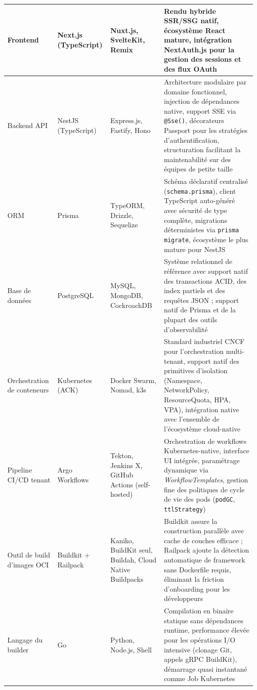\begin{longtable}{|p{2.8cm}|p{2.5cm}|p{2.5cm}|p{5.2cm}|}
Frontend
  & Next.js (TypeScript)
  & Nuxt.js, SvelteKit, Remix
  & Rendu hybride SSR/SSG natif, écosystème React mature, intégration NextAuth.js pour la gestion des sessions et des flux OAuth \\
\hline
Backend API
  & NestJS (TypeScript)
  & Express.js, Fastify, Hono
  & Architecture modulaire par domaine fonctionnel, injection de dépendances native, support SSE via \texttt{@Sse()}, décorateurs Passport pour les stratégies d'authentification, structuration facilitant la maintenabilité sur des équipes de petite taille \cite{nestjs-auth} \\
\hline
ORM
  & Prisma
  & TypeORM, Drizzle, Sequelize
  & Schéma déclaratif centralisé (\texttt{schema.prisma}), client TypeScript auto-généré avec sécurité de type complète, migrations déterministes via \texttt{prisma migrate}, écosystème le plus mature pour NestJS \cite{prisma-docs} \\
\hline
Base de données
  & PostgreSQL
  & MySQL, MongoDB, CockroachDB
  & Système relationnel de référence avec support natif des transactions ACID, des index partiels et des requêtes JSON ; support natif de Prisma et de la plupart des outils d'observabilité \cite{postgresql-docs} \\
\hline
Orchestration de conteneurs
  & Kubernetes (ACK)
  & Docker Swarm, Nomad, k3s
  & Standard industriel CNCF pour l'orchestration multi-tenant, support natif des primitives d'isolation (Namespace, NetworkPolicy, ResourceQuota, HPA, VPA), intégration native avec l'ensemble de l'écosystème cloud-native \cite{k8s-concepts} \\
\hline
Pipeline CI/CD tenant
  & Argo Workflows
  & Tekton, Jenkins X, GitHub Actions (self-hosted)
  & Orchestration de workflows Kubernetes-native, interface UI intégrée, paramétrage dynamique via \textit{WorkflowTemplates}, gestion fine des politiques de cycle de vie des pods (\texttt{podGC}, \texttt{ttlStrategy}) \cite{argo-rest-api} \\
\hline
Outil de build d'images OCI
  & Buildkit + Railpack
  & Kaniko, BuildKit seul, Buildah, Cloud Native Buildpacks
  & Buildkit assure la construction parallèle avec cache de couches efficace ; Railpack ajoute la détection automatique de framework sans Dockerfile requis, éliminant la friction d'onboarding pour les développeurs \cite{buildkit-client}\cite{railpack-github} \\
\hline
Langage du builder
  & Go
  & Python, Node.js, Shell
  & Compilation en binaire statique sans dépendances runtime, performance élevée pour les opérations I/O intensive (clonage Git, appels gRPC BuildKit), démarrage quasi instantané comme Job Kubernetes \cite{go-docs} \\

\end{longtable}
